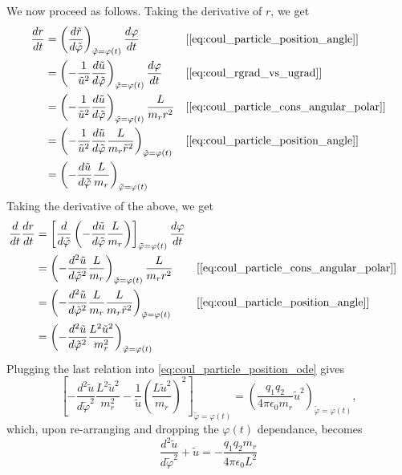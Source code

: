 \documentclass[a4paper,11pt]{report}
\begin{document}
We now proceed as follows. Taking the derivative of $r$, we get
\begin{align}
    \label{eq:coul_particle_derivation_1}
    \frac{dr}{dt} &= \left ( \frac{d \tilde{r}}{d\tilde{\varphi}} \right )_{\tilde{\varphi} = \varphi(t)} \frac{d \varphi}{dt} &&[\cref{eq:coul_particle_position_angle}] \nonumber \\
    &= \left ( -\frac{1}{\tilde{u}^2} \frac{d\tilde{u}}{d\tilde{\varphi}} \right )_{\tilde{\varphi} = \varphi(t)} \frac{d \varphi}{dt} &&[\cref{eq:coul_rgrad_vs_ugrad}]\nonumber \\ 
    &= \left ( -\frac{1}{\tilde{u}^2} \frac{d\tilde{u}}{d\tilde{\varphi}} \right )_{\tilde{\varphi} = \varphi(t)} \frac{L}{m_r r^2} &&[\cref{eq:coul_particle_cons_angular_polar}] \nonumber \\
    &= \left ( -\frac{1}{\tilde{u}^2} \frac{d\tilde{u}}{d\tilde{\varphi}} \frac{L}{m_r \tilde{r}^2} \right )_{\tilde{\varphi} = \varphi(t)} &&[\cref{eq:coul_particle_position_angle}] \nonumber \\
    &= \left ( - \frac{d\tilde{u}}{d\tilde{\varphi}} \frac{L}{m_r} \right )_{\tilde{\varphi} = \varphi(t)}
\end{align}
Taking the derivative of the above, we get
\begin{align}
    \frac{d}{dt} \frac{dr}{dt} &= \left [ \frac{d}{d\tilde{\varphi}} \left ( - \frac{d\tilde{u}}{d\tilde{\varphi}} \frac{L}{m_r} \right ) \right ]_{\tilde{\varphi} = \varphi(t)} \frac{d \varphi}{dt} \nonumber \\
    &= \left ( - \frac{d^2 \tilde{u}}{d\tilde{\varphi}^2} \frac{L}{m_r} \right )_{\tilde{\varphi} = \varphi(t)} \frac{L}{m_r r^2} && [\cref{eq:coul_particle_cons_angular_polar}] \nonumber \\
    &= \left ( - \frac{d^2 \tilde{u}}{d\tilde{\varphi}^2} \frac{L}{m_r} \frac{L}{m_r \tilde{r}^2} \right )_{\tilde{\varphi} = \varphi(t)} && [\cref{eq:coul_particle_position_angle}] \nonumber \\
    &= \left ( - \frac{d^2 \tilde{u}}{d\tilde{\varphi}^2} \frac{L^2 \tilde{u}^2}{m_r^2} \right )_{\tilde{\varphi} = \varphi(t)}
\end{align}
Plugging the last relation into \cref{eq:coul_particle_position_ode} gives
\begin{equation*}
    \left [ - \frac{d^2 \tilde{u}}{d\tilde{\varphi}^2} \frac{L^2 \tilde{u}^2}{m_r^2} - \frac{1}{\tilde{u}} \left ( \frac{L \tilde{u}^2}{m_r} \right )^2 \right ]_{\tilde{\varphi} = \varphi(t)} = \left ( \frac{q_1 q_2}{4 \pi \epsilon_0 m_r} \tilde{u}^2 \right )_{\tilde{\varphi} = \varphi(t)},
\end{equation*}
which, upon re-arranging and dropping the $\varphi(t)$ dependance, becomes
\begin{equation}
    \frac{d^2 \tilde{u}}{d \tilde{\varphi}^2} + \tilde{u} = -\frac{q_1 q_2 m_r}{4 \pi \epsilon_0 L^2}
\end{equation}
\end{document}
